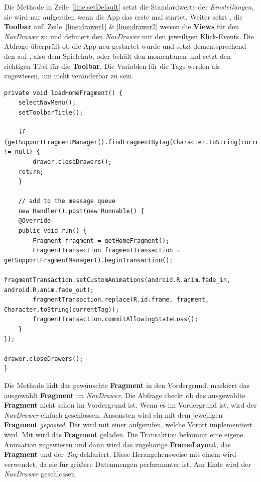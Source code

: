 Die Methode in Zeile~\ref{line:setDefault} setzt die Standardwerte der
\emph{Einstellungen}, sie wird nur aufgerufen wenn die App das erste mal
startet. Weiter setzt , die \textbf{Toolbar} auf.
Zeile~\ref{line:drawer1} \& \ref{line:drawer2} weisen die \textbf{Views} für den
\emph{NavDrawer} zu und  definiert den
\emph{NavDrawer} mit den jeweiligen Klick-Events. Die  Abfrage
überprüft ob die App neu gestartet wurde und setzt dementsprechend den
 auf , also dem Spielehub, oder behält den
momentanen und setzt den richtigen Titel für die \textbf{Toolbar}. Die Variablen
für die Tags werden als  zugewiesen, um nicht veränderbar zu
sein.

\begin{lstlisting}[caption={Hub loadHomeFragment() Methode},captionpos=b]
private void loadHomeFragment() {
	selectNavMenu();
	setToolbarTitle();

	if (getSupportFragmentManager().findFragmentByTag(Character.toString(currentTag)) != null) {
		drawer.closeDrawers();
	return;
	}

	// add to the message queue
	new Handler().post(new Runnable() {
	@Override
	public void run() {
		Fragment fragment = getHomeFragment();
		FragmentTransaction fragmentTransaction = getSupportFragmentManager().beginTransaction();
		fragmentTransaction.setCustomAnimations(android.R.anim.fade_in, android.R.anim.fade_out);
		fragmentTransaction.replace(R.id.frame, fragment, Character.toString(currentTag));
		fragmentTransaction.commitAllowingStateLoss();
	}
});

drawer.closeDrawers();
}
\end{lstlisting}

Die Methode  lädt das gewünschte \textbf{Fragment} in den
Vordergrund.  markiert das ausgewählt \textbf{Fragment} im
\emph{NavDrawer}. Die  Abfrage checkt ob das ausgewählte 
\textbf{Fragment} nicht schon im Vordergrund ist. Wenn es im Vordergrund ist,
wird der \emph{NavDrawer} einfach geschlossen. Ansonsten wird ein 
mit dem jeweiligen \textbf{Fragment} \emph{geposted}. Der  wird
mit einer  aufgerufen, welche Vorort implementiert wird. Mit
 wird das \textbf{Fragment} geladen. Die Transaktion
bekommt eine eigene Animation zugewiesen und dann wird das zugehörige
\textbf{FrameLayout}, das \textbf{Fragment} und der \emph{Tag} deklariert. Diese
Herangehensweise mit einem  wird verwendet, da sie für größere
Datenmengen performanter ist. Am Ende wird der \emph{NavDrawer} geschlossen.

